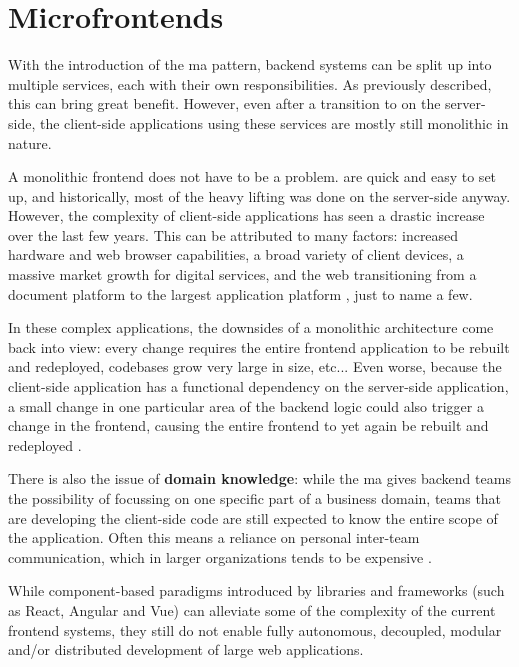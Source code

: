 \section{Microfrontends}

With the introduction of the \gls{ma} pattern, \gls{backend} systems can be
split up into multiple services, each with their own responsibilities. As
previously described, this can bring great benefit. However, even after a
transition to  on the server-side, the client-side
applications using these services are mostly still \gls{monolithic} in nature.

A \gls{monolithic} \gls{frontend} does not have to be a problem.
 are quick and easy to set up, and historically, most of the
heavy lifting was done on the server-side anyway. However, the complexity of
client-side applications has seen a drastic increase over the last few years.
This can be attributed to many factors: increased hardware and web browser
capabilities, a broad variety of client devices, a massive market growth for
digital services, and the web transitioning from a document platform to the
largest application platform \autocite{Ball_2019}, just to name a few.

In these complex applications, the downsides of a \gls{monolithic} architecture
come back into view: every change requires the entire \gls{frontend} application
to be rebuilt and redeployed, codebases grow very large in size, etc... Even
worse, because the client-side application has a functional dependency on the
server-side application, a small change in one particular area of the
\gls{backend} logic could also trigger a change in the \gls{frontend}, causing
the entire \gls{frontend} to yet again be rebuilt and redeployed
\autocite{Rappl_LogRocket_2019}.

There is also the issue of \textbf{domain knowledge}: while the \gls{ma} gives
\gls{backend} teams the possibility of focussing on one specific part of a
business domain, teams that are developing the client-side code are still
expected to know the entire scope of the application. Often this means a
reliance on personal inter-team communication, which in larger organizations
tends to be expensive \autocite{Geers_2020}. 

While component-based paradigms introduced by libraries and frameworks (such as
React,
Angular and
Vue) can alleviate some of the complexity of the
current \gls{frontend} systems, they still do not enable  fully autonomous, decoupled,
modular and/or distributed development of large web applications.

